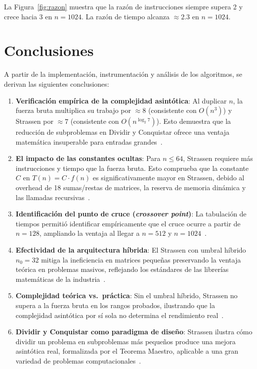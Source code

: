 \documentclass[12pt,a4paper]{article}
\begin{document}
La Figura~\ref{fig:razon} muestra que la raz\'on de instrucciones siempre
supera 2 y crece hacia 3 en $n = 1024$. La raz\'on de tiempo alcanza
$\approx 2{.}3$ en $n = 1024$.

\section{Conclusiones}

A partir de la implementaci\'on, instrumentaci\'on y an\'alisis de los
algoritmos, se derivan las siguientes conclusiones:

\begin{enumerate}

    \item \textbf{Verificaci\'on emp\'irica de la complejidad asint\'otica}:
    Al duplicar $n$, la fuerza bruta multiplica su trabajo por $\approx 8$
    (consistente con $O(n^3)$) y Strassen por $\approx 7$ (consistente con
    $O(n^{\log_2 7})$). Esto demuestra que la reducci\'on de subproblemas en
    Dividir y Conquistar ofrece una ventaja matem\'atica insuperable para
    entradas grandes~\cite{cormen2009introduction}.

    \item \textbf{El impacto de las constantes ocultas}:
    Para $n \le 64$, Strassen requiere m\'as instrucciones y tiempo que la
    fuerza bruta. Esto comprueba que la constante $C$ en $T(n) = C \cdot f(n)$
    es significativamente mayor en Strassen, debido al overhead de 18
    sumas/restas de matrices, la reserva de memoria din\'amica y las llamadas
    recursivas~\cite{higham2002accuracy}.

    \item \textbf{Identificaci\'on del punto de cruce (\emph{crossover point})}:
    La tabulaci\'on de tiempos permiti\'o identificar emp\'iricamente que el
    cruce ocurre a partir de $n = 128$, ampliando la ventaja al llegar a
    $n = 512$ y $n = 1024$~\cite{benson2014framework}.

    \item \textbf{Efectividad de la arquitectura h\'ibrida}:
    El Strassen con umbral h\'ibrido $n_0 = 32$ mitiga la ineficiencia en
    matrices peque\~nas preservando la ventaja te\'orica en problemas masivos,
    reflejando los est\'andares de las librer\'ias matem\'aticas de la
    industria~\cite{benson2014framework,golub2013matrix}.

    \item \textbf{Complejidad te\'orica vs.\ pr\'actica}:
    Sin el umbral h\'ibrido, Strassen no supera a la fuerza bruta en los
    rangos probados, ilustrando que la complejidad asint\'otica por s\'i sola
    no determina el rendimiento real~\cite{skiena2020algorithm}.

    \item \textbf{Dividir y Conquistar como paradigma de dise\~no}:
    Strassen ilustra c\'omo dividir un problema en subproblemas m\'as
    peque\~nos produce una mejora asint\'otica real, formalizada por el
    Teorema Maestro, aplicable a una gran variedad de problemas
    computacionales~\cite{cormen2009introduction,skiena2020algorithm}.

\end{enumerate}
\end{document}
